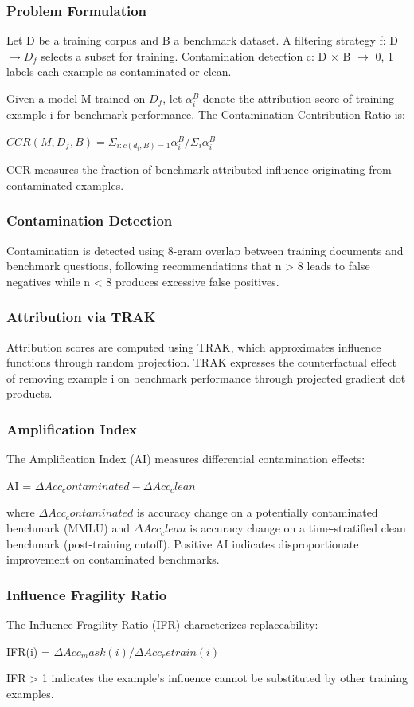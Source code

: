 
\subsubsection{Problem Formulation}

Let D be a training corpus and B a benchmark dataset. A filtering strategy f: D $\rightarrow D_f$ selects a subset for training. Contamination detection c: D $\times$ B $\rightarrow$ {0, 1} labels each example as contaminated or clean.

Given a model M trained on $D_f$, let $\alpha _{i}^B$ denote the attribution score of training example i for benchmark performance. The Contamination Contribution Ratio is:

$CCR(M, D_f, B) = \Sigma _{i: c(d_i, B)=1} \alpha _{i}^B / \Sigma _i \alpha _{i}^B$

CCR measures the fraction of benchmark-attributed influence originating from contaminated examples.

\subsubsection{Contamination Detection}

Contamination is detected using 8-gram overlap between training documents and benchmark questions, following recommendations that n > 8 leads to false negatives while n < 8 produces excessive false positives.

\subsubsection{Attribution via TRAK}

Attribution scores are computed using TRAK, which approximates influence functions through random projection. TRAK expresses the counterfactual effect of removing example i on benchmark performance through projected gradient dot products.

\subsubsection{Amplification Index}

The Amplification Index (AI) measures differential contamination effects:

AI = $\Delta Acc_contaminated - \Delta Acc_clean$

where $\Delta Acc_contaminated$ is accuracy change on a potentially contaminated benchmark (MMLU) and $\Delta Acc_clean$ is accuracy change on a time-stratified clean benchmark (post-training cutoff). Positive AI indicates disproportionate improvement on contaminated benchmarks.

\subsubsection{Influence Fragility Ratio}

The Influence Fragility Ratio (IFR) characterizes replaceability:

IFR(i) = $\Delta Acc_mask(i) / \Delta Acc_retrain(i)$

IFR > 1 indicates the example's influence cannot be substituted by other training examples.
